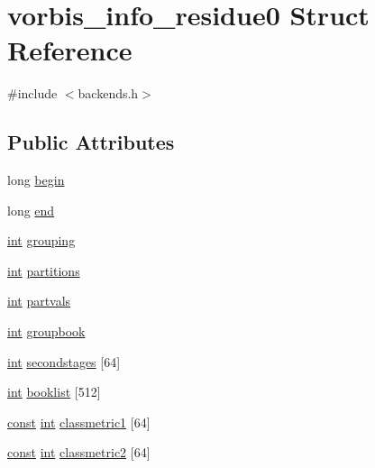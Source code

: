 \hypertarget{structvorbis__info__residue0}{}\section{vorbis\+\_\+info\+\_\+residue0 Struct Reference}
\label{structvorbis__info__residue0}


{\ttfamily \#include $<$backends.\+h$>$}

\subsection*{Public Attributes}
\begin{DoxyCompactItemize}
\item 
long \hyperlink{structvorbis__info__residue0_a655b0a80983f1646b7ad64fce2a14732}{begin}
\item 
long \hyperlink{structvorbis__info__residue0_af8ce4aeb45a448181c3cd5079908627c}{end}
\item 
\hyperlink{xmltok_8h_a5a0d4a5641ce434f1d23533f2b2e6653}{int} \hyperlink{structvorbis__info__residue0_afc030387b36d8397db6014464a8103c2}{grouping}
\item 
\hyperlink{xmltok_8h_a5a0d4a5641ce434f1d23533f2b2e6653}{int} \hyperlink{structvorbis__info__residue0_a466dc773410639c9786d33301cac61ed}{partitions}
\item 
\hyperlink{xmltok_8h_a5a0d4a5641ce434f1d23533f2b2e6653}{int} \hyperlink{structvorbis__info__residue0_a44650904dcc80ac19b1d3a0ee910be62}{partvals}
\item 
\hyperlink{xmltok_8h_a5a0d4a5641ce434f1d23533f2b2e6653}{int} \hyperlink{structvorbis__info__residue0_aa3b476197866f9666cc4294f60273f84}{groupbook}
\item 
\hyperlink{xmltok_8h_a5a0d4a5641ce434f1d23533f2b2e6653}{int} \hyperlink{structvorbis__info__residue0_a744daf253a651d2e13a3f80d4220c28e}{secondstages} \mbox{[}64\mbox{]}
\item 
\hyperlink{xmltok_8h_a5a0d4a5641ce434f1d23533f2b2e6653}{int} \hyperlink{structvorbis__info__residue0_a8ccd8efac3cb904de700849ca5c9b765}{booklist} \mbox{[}512\mbox{]}
\item 
\hyperlink{getopt1_8c_a2c212835823e3c54a8ab6d95c652660e}{const} \hyperlink{xmltok_8h_a5a0d4a5641ce434f1d23533f2b2e6653}{int} \hyperlink{structvorbis__info__residue0_a3996afb2e64236286291ceb2fa072f79}{classmetric1} \mbox{[}64\mbox{]}
\item 
\hyperlink{getopt1_8c_a2c212835823e3c54a8ab6d95c652660e}{const} \hyperlink{xmltok_8h_a5a0d4a5641ce434f1d23533f2b2e6653}{int} \hyperlink{structvorbis__info__residue0_a45f75a88a42cd11eb058ec79effca129}{classmetric2} \mbox{[}64\mbox{]}
\end{DoxyCompactItemize}


